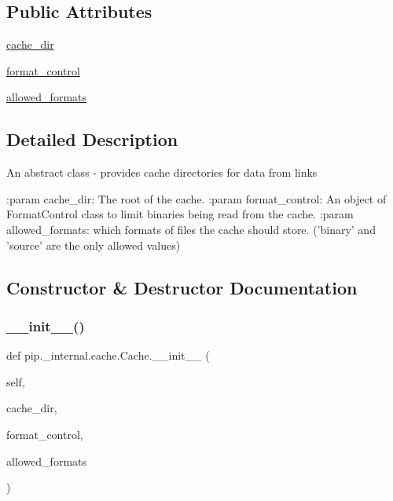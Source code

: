 \subsection*{Public Attributes}
\begin{DoxyCompactItemize}
\item 
\hyperlink{classpip_1_1__internal_1_1cache_1_1Cache_aed8f0121963b4d3095aaa0b2ea344012}{cache\+\_\+dir}
\item 
\hyperlink{classpip_1_1__internal_1_1cache_1_1Cache_ac6051e5c3dff9ba7c7e5968e82acc9d2}{format\+\_\+control}
\item 
\hyperlink{classpip_1_1__internal_1_1cache_1_1Cache_a367ac1a183aca35d140712d557adb388}{allowed\+\_\+formats}
\end{DoxyCompactItemize}


\subsection{Detailed Description}
\begin{DoxyVerb}An abstract class - provides cache directories for data from links


    :param cache_dir: The root of the cache.
    :param format_control: An object of FormatControl class to limit
        binaries being read from the cache.
    :param allowed_formats: which formats of files the cache should store.
        ('binary' and 'source' are the only allowed values)
\end{DoxyVerb}
 

\subsection{Constructor \& Destructor Documentation}
\mbox{\label{classpip_1_1__internal_1_1cache_1_1Cache_a4b7761f49e02faa5e273b43eb21742f4}} 
\subsubsection{\texorpdfstring{\+\_\+\+\_\+init\+\_\+\+\_\+()}{\_\_init\_\_()}}
{\footnotesize\ttfamily def pip.\+\_\+internal.\+cache.\+Cache.\+\_\+\+\_\+init\+\_\+\+\_\+ (\begin{DoxyParamCaption}\item[{}]{self,  }\item[{}]{cache\+\_\+dir,  }\item[{}]{format\+\_\+control,  }\item[{}]{allowed\+\_\+formats }\end{DoxyParamCaption})}



